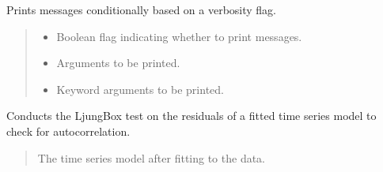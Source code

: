 \documentclass[letterpaper,10pt,english]{sphinxmanual}
\begin{document}
\begin{fulllineitems}
\label{\detokenize{docs/time_series_analysis:time_series_analysis.conditional_print}}
\pysigstartsignatures
{}
\pysigstopsignatures
\sphinxAtStartPar
Prints messages conditionally based on a verbosity flag.
\begin{quote}\begin{description}
\begin{itemize}
\item {} 
\sphinxAtStartPar
{} \textendash{} Boolean flag indicating whether to print messages.

\item {} 
\sphinxAtStartPar
{} \textendash{} Arguments to be printed.

\item {} 
\sphinxAtStartPar
{} \textendash{} Keyword arguments to be printed.

\end{itemize}

\end{description}\end{quote}

\end{fulllineitems}


\begin{fulllineitems}
\label{\detokenize{docs/time_series_analysis:time_series_analysis.ljung_box_test}}
\pysigstartsignatures
{}
\pysigstopsignatures
\sphinxAtStartPar
Conducts the Ljung\sphinxhyphen{}Box test on the residuals of a fitted time series model to check for autocorrelation.
\begin{quote}\begin{description}
\sphinxAtStartPar
{} \textendash{} The time series model after fitting to the data.

\end{description}\end{quote}

\end{fulllineitems}
\end{document}
